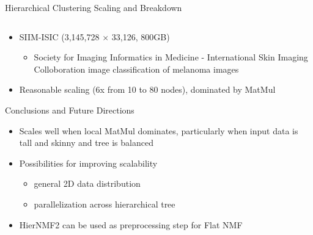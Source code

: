\documentclass{beamer}
\begin{document}
\begin{frame}{Hierarchical Clustering Scaling and Breakdown}
\begin{columns}
\begin{column}{0.5\textwidth}
        \end{column}
    \end{columns}
    \begin{itemize}
    \small
        \item SIIM-ISIC (3{,}145{,}728 $\times$ 33{,}126, 800GB)
        \begin{itemize}
            \item Society for Imaging Informatics in Medicine - International Skin Imaging Colloboration image classification of melanoma images
        \end{itemize}
        \item Reasonable scaling (6x from 10 to 80 nodes), dominated by MatMul
    \end{itemize}
\end{frame}

\begin{frame}{Conclusions and Future Directions}

\begin{itemize}
	\item Scales well when local MatMul dominates, particularly when input data is tall and skinny and tree is balanced
	\vfill
	\item Possibilities for improving scalability
	\begin{itemize}
		\item general 2D data distribution
		\item parallelization across hierarchical tree
	\end{itemize}
	\vfill
	\item HierNMF2 can be used as preprocessing step for Flat NMF
\end{itemize}

\end{frame}
\end{document}
